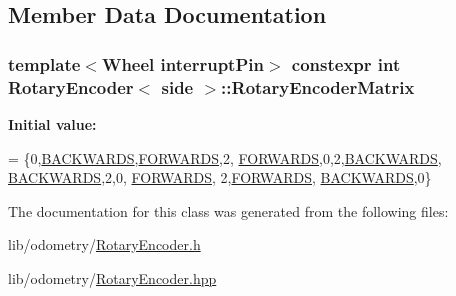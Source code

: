 \subsection{Member Data Documentation}
\hypertarget{class_rotary_encoder_a97a8bdc99c6ce9ca44d4a668d6355a7c}{
\subsubsection[{Rotary\-Encoder\-Matrix}]{\setlength{\rightskip}{0pt plus 5cm}template$<$Wheel interrupt\-Pin$>$ constexpr int {\bf Rotary\-Encoder}$<$ side $>$\-::Rotary\-Encoder\-Matrix\hspace{0.3cm}{\ttfamily [static]}}}\label{class_rotary_encoder_a97a8bdc99c6ce9ca44d4a668d6355a7c}
{\bfseries Initial value\-:}
\begin{DoxyCode}
= \{0,\hyperlink{class_encoder_aa7c4648a7ebc9e651c25c2d450a58213a9fb277421175dd4894688e30dd757253}{BACKWARDS},\hyperlink{class_encoder_aa7c4648a7ebc9e651c25c2d450a58213a75ee06096317d25b47119647e33622cf}{FORWARDS},2, 
                                                  \hyperlink{class_encoder_aa7c4648a7ebc9e651c25c2d450a58213a75ee06096317d25b47119647e33622cf}{FORWARDS},0,2,\hyperlink{class_encoder_aa7c4648a7ebc9e651c25c2d450a58213a9fb277421175dd4894688e30dd757253}{BACKWARDS}, 
                                                  \hyperlink{class_encoder_aa7c4648a7ebc9e651c25c2d450a58213a9fb277421175dd4894688e30dd757253}{BACKWARDS},2,0,
      \hyperlink{class_encoder_aa7c4648a7ebc9e651c25c2d450a58213a75ee06096317d25b47119647e33622cf}{FORWARDS}, 
                                                  2,\hyperlink{class_encoder_aa7c4648a7ebc9e651c25c2d450a58213a75ee06096317d25b47119647e33622cf}{FORWARDS}, \hyperlink{class_encoder_aa7c4648a7ebc9e651c25c2d450a58213a9fb277421175dd4894688e30dd757253}{BACKWARDS},0\}
\end{DoxyCode}


The documentation for this class was generated from the following files\-:\begin{DoxyCompactItemize}
\item 
lib/odometry/\hyperlink{_rotary_encoder_8h}{Rotary\-Encoder.\-h}\item 
lib/odometry/\hyperlink{_rotary_encoder_8hpp}{Rotary\-Encoder.\-hpp}\end{DoxyCompactItemize}
